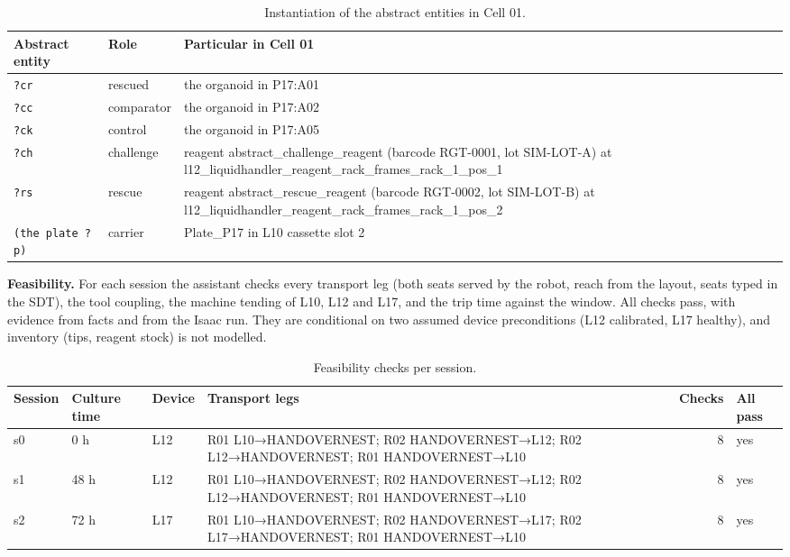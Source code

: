 \documentclass[10pt,a4paper]{article}
\begin{document}
\begin{table}[tbp]\centering\small
\caption{Instantiation of the abstract entities in Cell 01.}\label{tab:instantiation}
\begin{tabularx}{\linewidth}{llX}\toprule
\textbf{Abstract entity} & \textbf{Role} & \textbf{Particular in Cell 01} \\\midrule
\texttt{?cr} & rescued & the organoid in P17:A01 \\
\texttt{?cc} & comparator & the organoid in P17:A02 \\
\texttt{?ck} & control & the organoid in P17:A05 \\
\texttt{?ch} & challenge & reagent abstract\_\allowbreak{}challenge\_\allowbreak{}reagent (barcode RGT-0001, lot SIM-LOT-A) at l12\_\allowbreak{}liquidhandler\_\allowbreak{}reagent\_\allowbreak{}rack\_\allowbreak{}frames\_\allowbreak{}rack\_\allowbreak{}1\_\allowbreak{}pos\_\allowbreak{}1 \\
\texttt{?rs} & rescue & reagent abstract\_\allowbreak{}rescue\_\allowbreak{}reagent (barcode RGT-0002, lot SIM-LOT-B) at l12\_\allowbreak{}liquidhandler\_\allowbreak{}reagent\_\allowbreak{}rack\_\allowbreak{}frames\_\allowbreak{}rack\_\allowbreak{}1\_\allowbreak{}pos\_\allowbreak{}2 \\
\texttt{(the plate ?p)} & carrier & Plate\_\allowbreak{}P17 in L10 cassette slot 2 \\\bottomrule
\end{tabularx}
\end{table}

\textbf{Feasibility.} For each session the assistant checks every transport leg (both seats served by the robot, reach from the layout, seats typed in the SDT), the tool coupling, the machine tending of L10, L12 and L17, and the trip time against the window. All checks pass, with evidence from facts and from the Isaac run. They are conditional on two assumed device preconditions (L12 calibrated, L17 healthy), and inventory (tips, reagent stock) is not modelled.

\begin{table}[tbp]\centering\small
\caption{Feasibility checks per session.}\label{tab:feas}
\begin{tabularx}{\linewidth}{lllXrl}\toprule
\textbf{Session} & \textbf{Culture time} & \textbf{Device} & \textbf{Transport legs} & \textbf{Checks} & \textbf{All pass} \\\midrule
s0 & 0 h & L12 & R01 L10→HANDOVERNEST; R02 HANDOVERNEST→L12; R02 L12→HANDOVERNEST; R01 HANDOVERNEST→L10 & 8 & yes \\
s1 & 48 h & L12 & R01 L10→HANDOVERNEST; R02 HANDOVERNEST→L12; R02 L12→HANDOVERNEST; R01 HANDOVERNEST→L10 & 8 & yes \\
s2 & 72 h & L17 & R01 L10→HANDOVERNEST; R02 HANDOVERNEST→L17; R02 L17→HANDOVERNEST; R01 HANDOVERNEST→L10 & 8 & yes \\\bottomrule
\end{tabularx}
\end{table}
\end{document}
